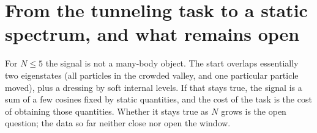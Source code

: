 
\section{From the tunneling task to a static spectrum, and what remains open}

\begin{plainwords}
For $N\le5$ the signal is not a many-body object. The start overlaps essentially two eigenstates (all particles in the crowded valley, and one particular particle moved), plus a dressing by soft internal levels. If that stays true, the signal is a sum of a few cosines fixed by static quantities, and the cost of the task is the cost of obtaining those quantities. Whether it stays true as $N$ grows is the open question; the data so far neither close nor open the window.
\end{plainwords}

